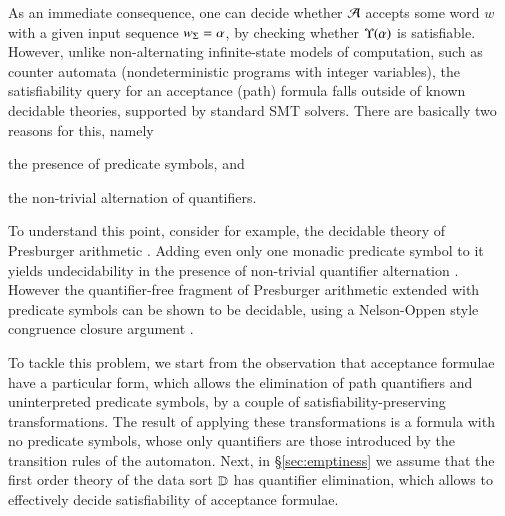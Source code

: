 As an immediate consequence, one can decide whether $\mathcal{A}$ accepts some
word $w$ with a given input sequence ${w}_\Sigma=\alpha$, by checking
whether $\Upsilon({\alpha})$ is satisfiable. However, unlike
non-alternating infinite-state models of computation, such as counter
automata (nondeterministic programs with integer variables), the
satisfiability query for an acceptance (path) formula falls outside of
known decidable theories, supported by standard SMT solvers. There are
basically two reasons for this, namely\ \begin{inparaenum}[(i)]
\item the presence of predicate symbols, and
\item the non-trivial alternation of quantifiers.
\end{inparaenum}
To understand this point, consider for example, the decidable theory
of Presburger arithmetic \cite{Presburger29}. Adding even only one
monadic predicate symbol to it yields undecidability in the presence
of non-trivial quantifier alternation \cite{Halpern91}. However the
quantifier-free fragment of Presburger arithmetic extended with
predicate symbols can be shown to be decidable, using a Nelson-Oppen
style congruence closure argument \cite{NelsonOppen80}.

To tackle this problem, we start from the observation that acceptance
formulae have a particular form, which allows the elimination of path
quantifiers and uninterpreted predicate symbols, by a couple of
satisfiability-preserving transformations. The result of applying
these transformations is a formula with no predicate symbols, whose
only quantifiers are those introduced by the transition rules of the
automaton. Next, in \S\ref{sec:emptiness} we assume that the first
order theory of the data sort $\mathbb{D}$ has quantifier elimination,
which allows to effectively decide satisfiability of acceptance
formulae.

